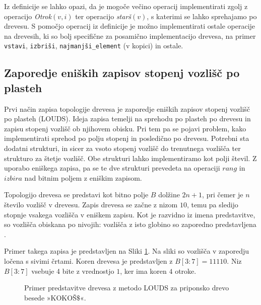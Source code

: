 Iz definicije se lahko opazi, da je mogoče večino operacij implementirati zgolj z operacijo \textit{Otrok}$(v,i)$ ter operacijo \textit{starš}$(v)$, s katerimi se lahko sprehajamo po drevesu. S pomočjo operacij iz definicije je možno implementirati ostale operacije na drevesih, ki so bolj specifične za posamično implementacijo drevesa, na primer \texttt{vstavi}, \texttt{izbriši}, \texttt{najmanjši\_element} (v kopici) in ostale.

\subsection{Zaporedje eniških zapisov stopenj vozlišč po plasteh}\label{sec:LOUDS}

Prvi način zapisa topologije drevesa je zaporedje eniških zapisov stopenj vozlišč po plasteh (LOUDS). Ideja zapisa temelji na sprehodu po plasteh po drevesu in zapisu stopenj vozlišč ob njihovem obisku. Pri tem pa se pojavi problem, kako implementirati sprehod po polju stopenj in posledično po drevesu. Potrebni sta dodatni strukturi, in sicer za vsoto stopenj vozlišč do trenutnega vozlišča ter strukturo za štetje vozlišč. Obe strukturi lahko implementiramo kot polji števil. Z uporabo eniškega zapisa, pa se te dve strukturi prevedeta na operaciji $rang$ in $izbira$ nad bitnim poljem z eniškim zapisom.    

Topologijo drevesa se predstavi kot bitno polje $B$ dolžine $2n+1$, pri čemer je $n$ število vozlišč v drevesu. Zapis drevesa se začne z nizom $10$, temu pa sledijo stopnje vsakega vozlišča v eniškem zapisu. Kot je razvidno iz imena predstavitve, so vozlišča obiskana po nivojih: vozlišča z isto globino so zaporedno predstavljena \cite{Navarro2016}.

Primer takega zapisa je predstavljen na Sliki \ref{fig:LOUDS}. Na sliki so vozlišča v zaporedju ločena s sivimi črtami. Koren drevesa je predstavljen z $B[3:7]=11110$. Niz $B[3:7]$ vsebuje 4 bite z vrednostjo $1$, ker ima koren $4$ otroke.

\begin{figure}[htb]
    \begin{center}
        
        \caption{Primer predstavitve drevesa z metodo LOUDS za priponsko drevo besede »KOKOŠ$\$$«.} 
        \label{fig:LOUDS}
    \end{center}
\end{figure}

